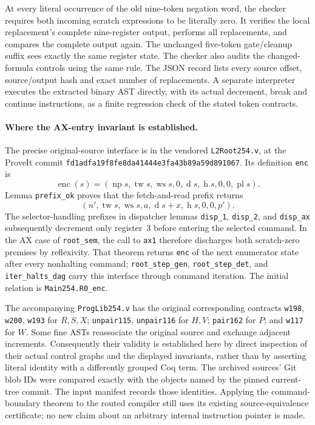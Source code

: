 At every literal occurrence of the old nine-token negation word, the
checker requires both incoming scratch expressions to be literally zero.
It verifies the local replacement's complete nine-register output, performs
all replacements, and compares the complete output again.  The unchanged
five-token gate/cleanup suffix sees exactly the same register state.
The checker also audits the changed-formula controls using the same rule.
The JSON record lists every source offset, source/output hash and exact
number of replacements.  A separate interpreter executes the extracted
binary AST directly, with its actual decrement, break and continue
instructions, as a finite regression check of the stated token contracts.

\paragraph{Where the AX-entry invariant is established.}
The precise original-source interface is in the vendored
\texttt{L2Root254.v}, at the ProveIt commit
\texttt{fd1adfa19f8fe8da41444e3fa43b89a59d891067}.
Its definition \texttt{enc} is
\[
 \operatorname{enc}(s)=
 (\operatorname{np}s,\operatorname{tw}s,\operatorname{ws}s,
  0,\operatorname{d}s,\operatorname{h}s,0,0,\operatorname{pl}s).
\]
Lemma \texttt{prefix\_ok} proves that the fetch-and-read prefix returns
\[
 (n',\operatorname{tw}s,\operatorname{ws}s,
  a,\operatorname{d}s+x,\operatorname{h}s,0,0,p').
\]
The selector-handling prefixes in dispatcher lemmas \texttt{disp\_1},
\texttt{disp\_2}, and \texttt{disp\_ax} subsequently decrement only
register~3 before entering the selected command.  In the AX case
of \texttt{root\_sem}, the call to \texttt{ax1} therefore discharges both
scratch-zero premises by reflexivity.  That theorem returns
\texttt{enc} of the next enumerator state after every nonhalting command;
\texttt{root\_step\_gen}, \texttt{root\_step\_det}, and
\texttt{iter\_halts\_dag} carry this interface through command iteration.
The initial relation is \texttt{Main254.R0\_enc}.

The accompanying \texttt{ProgLib254.v} has the original corresponding
contracts \texttt{w198}, \texttt{w200}, \texttt{w193} for $R,S,X$;
\texttt{unpair115}, \texttt{unpair116} for $H,V$;
\texttt{pair162} for $P$; and \texttt{w117} for $W$.
Some fine ASTs reassociate the original source and exchange adjacent
increments.  Consequently their validity is established here by direct
inspection of their actual control graphs and the displayed invariants,
rather than by asserting literal identity with a differently grouped Coq
term.  The archived sources' Git blob IDs were compared exactly with the
objects named by the pinned current-tree commit.  The input manifest records
those identities.  Applying the command-boundary theorem to the routed
compiler still uses its existing source-equivalence certificate; no new
claim about an arbitrary internal instruction pointer is made.

